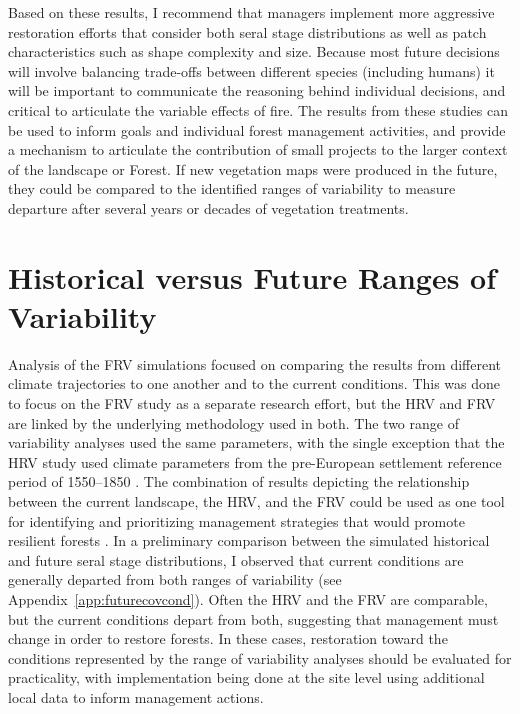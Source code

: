 Based on these results, I recommend that managers implement more aggressive restoration efforts that consider both seral stage distributions as well as patch characteristics such as shape complexity and size. Because most future decisions will involve balancing trade-offs between different species (including humans) it will be important to communicate the reasoning behind individual decisions, and critical to articulate the variable effects of fire. The results from these studies can be used to inform goals and individual forest management activities, and provide a mechanism to articulate the contribution of small projects to the larger context of the landscape or Forest. If new vegetation maps were produced in the future, they could be compared to the identified ranges of variability to measure departure after several years or decades of vegetation treatments.


\section{Historical versus Future Ranges of Variability}
Analysis of the FRV simulations focused on comparing the results from different climate trajectories to one another and to the current conditions. This was done to focus on the FRV study as a separate research effort, but the HRV and FRV are linked by the underlying methodology used in both. The two range of variability analyses used the same parameters, with the single exception that the HRV study used climate parameters from the pre-European settlement reference period of 1550--1850 \citep{Safford2013}. The combination of results depicting the relationship between the current landscape, the HRV, and the FRV could be used as one tool for identifying and prioritizing management strategies that would promote resilient forests \citep{Keane2009}. In a preliminary comparison between the simulated historical and future seral stage distributions, I observed that current conditions are generally departed from both ranges of variability (see Appendix~\ref{app:futurecovcond}). Often the HRV and the FRV are comparable, but the current conditions depart from both, suggesting that management must change in order to restore forests. In these cases, restoration toward the conditions represented by the range of variability analyses should be evaluated for practicality, with implementation being done at the site level using additional local data to inform management actions.

